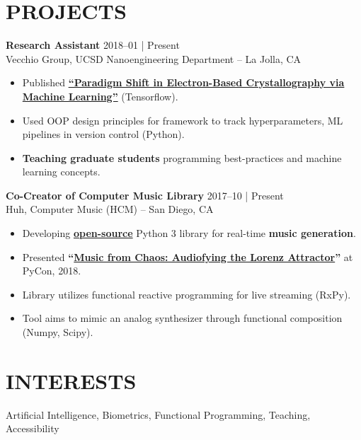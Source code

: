 \documentclass[line,mm]{res}
\begin{document}
\section{PROJECTS}
{\bf Research Assistant } \hfill            2018--01 | Present \\
  Vecchio Group, UCSD Nanoengineering Department -- La Jolla, CA
  \begin{itemize}  \itemsep -2pt %
     \item Published \href{https://arxiv.org/ftp/arxiv/papers/1902/1902.03682.pdf}{{\bf ``Paradigm Shift in Electron-Based Crystallography via Machine Learning''}} (Tensorflow). 
     \item Used OOP design principles for framework to track hyperparameters, ML pipelines in version control (Python).
     \item {\bf Teaching graduate students} programming best-practices and machine learning concepts.  
  \end{itemize} 


{\bf Co-Creator of Computer Music Library} \hfill 	 2017--10 | Present  \\
  Huh, Computer Music (HCM) -- San Diego, CA
  \begin{itemize}  \itemsep -2pt %
    \item Developing \href{https://github.com/alxrsngrtn/huh-computer-music}{{\bf open-source}} Python 3 library for real-time {\bf music generation}.  
    \item Presented {\bf ``\href{https://youtu.be/bTAFl8P2DkE?t=28m47s}{Music from Chaos: Audiofying the Lorenz Attractor}''} at PyCon, 2018.
    \item Library utilizes functional reactive programming for live streaming (RxPy).
    \item Tool aims to mimic an analog synthesizer through functional composition (Numpy, Scipy).
  \end{itemize}

\section{INTERESTS}
Artificial Intelligence, Biometrics, Functional Programming, Teaching, Accessibility
                 
\end{document}
